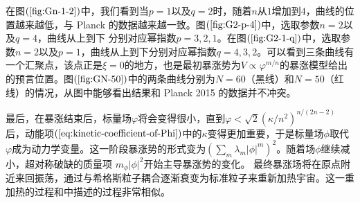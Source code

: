 在图$(\ref{fig:Gn-1-2})$中，我们看到当$p=1$以及$q=2$时，随着$n$从$1$增加到$4$，曲线的位置越来越低，与
Planck
的数据越来越一致。图$(\ref{fig:G2-p-4})$中，选取参数$n=2$以及$q=4$，曲线从上到下
分别对应幂指数$p=3,2,1$。在图$(\ref{fig:G2-1-q})$中，选取参数$n=2$以及$p=1$，曲线从上到下分别对应幂指数$q=4,3,2$。可以看到三条曲线有一个汇聚点，该点正是$\xi=0$的地方，也是最初暴涨势为$V\propto
\varphi^{m
/n}$的暴涨模型给出的预言位置。图$(\ref{fig:GN-50})$中的两条曲线分别为$N=60$（黑线）和$N=50$（红线）的情况，从图中能够看出结果和
Planck 2015 的数据并不冲突。

最后，在暴涨结束后，标量场$\varphi$将会变得很小，直到$\varphi <
\sqrt{2}{\left(\kappa /n^2\right)}^{n
/(2n-2)}$后，动能项$(\ref{eq:kinetic-coefficient-of-Phi})$中的$\kappa$变得更加重要，于是标量场$\phi$取代$\varphi$成为动力学变量。这一阶段暴涨势的形式变为${\left(\sum_m
\lambda_m \left\lvert
\phi\right\rvert^{m}\right)}^2$。随着场$\phi$继续减小，超对称破缺的质量项
$m_{\phi}\left\lvert\phi\right\rvert^2$开始主导暴涨势的变化。
最终暴涨场将在原点附近来回振荡，通过与希格斯粒子耦合逐渐衰变为标准粒子来重新加热宇宙。这一重加热的过程和\citep{nakayama2010running}中描述的过程非常相似。

